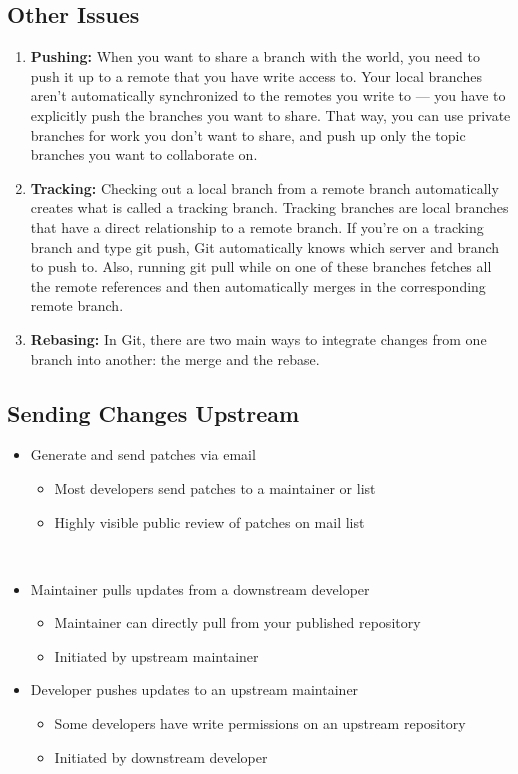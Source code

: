 \documentclass[draftclsnofoot,journal,onecolumn,12pt]{IEEEtran}
\begin{document}
\subsection{Other Issues}
\begin{enumerate}
  \item \textbf{Pushing:} When you want to share a branch with the world, you need to push it up to a remote that you have write access to. Your local branches aren’t automatically synchronized to the remotes you write to — you have to explicitly push the branches you want to share. That way, you can use private branches for work you don’t want to share, and push up only the topic branches you want to collaborate on.
  \item \textbf{Tracking:} Checking out a local branch from a remote branch automatically creates what is called a tracking branch. Tracking branches are local branches that have a direct relationship to a remote branch. If you’re on a tracking branch and type git push, Git automatically knows which server and branch to push to. Also, running git pull while on one of these branches fetches all the remote references and then automatically merges in the corresponding remote branch.
  \item \textbf{Rebasing:} In Git, there are two main ways to integrate changes from one branch into another: the merge and the rebase.
\end{enumerate}


\subsection{Sending Changes Upstream}
\begin{itemize}
  \item Generate and send patches via email
    \begin{itemize}
      \item Most developers send patches to a maintainer or list
      \item Highly visible public review of patches on mail list
    \end{itemize}
\item Maintainer pulls updates from a downstream developer
    \begin{itemize}
      \item Maintainer can directly pull from your published repository
      \item Initiated by upstream maintainer
    \end{itemize}
  \item Developer pushes updates to an upstream maintainer
    \begin{itemize}
      \item Some developers have write permissions on an upstream repository
      \item Initiated by downstream developer
    \end{itemize}
\end{itemize}
\end{document}
